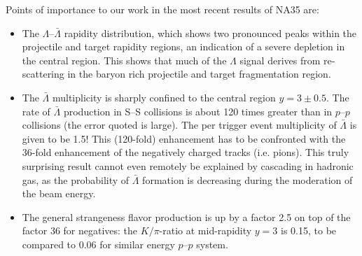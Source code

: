 \begin{mdframed}[linecolor=gray,roundcorner=12pt,backgroundcolor=Dandelion!15,linewidth=1pt,leftmargin=0cm,rightmargin=0cm,topline=true,bottomline=true,skipabove=12pt]
Points of importance to our work in the most recent results of NA35 are:
\begin{itemize}
\item The $\Lambda$--$\bar\Lambda$ rapidity distribution, which shows two
pronounced peaks within the projectile and target rapidity regions, an
indication of a severe depletion in the central region. This shows that
much of the $\Lambda$ signal derives from re-scattering in the baryon rich
projectile and target fragmentation region.
%
\item The ${\bar\Lambda}$ multiplicity is sharply confined to the central
region $y = 3 \pm 0.5$. The rate of ${\bar\Lambda}$ production in S--S
collisions is about 120 times greater than in $p$--$p$ collisions (the error
quoted is large). The per trigger event multiplicity of ${\bar\Lambda}$ is
given to be 1.5! This (120-fold) enhancement has to be confronted with the
36-fold enhancement of the negatively charged tracks (i.e. pions). This
truly surprising result cannot even remotely be explained by cascading in
hadronic gas, as the probability of ${\bar\Lambda}$ formation is
decreasing during the moderation of the beam energy.
%
\item The general strangeness flavor production is up by a factor 2.5 on
top of the factor 36 for negatives: the $K/\pi$-ratio at mid-rapidity
$y=3$ is 0.15, to be compared to 0.06 for similar energy $p$--$p$ system. 
\end{itemize}


\end{mdframed}
